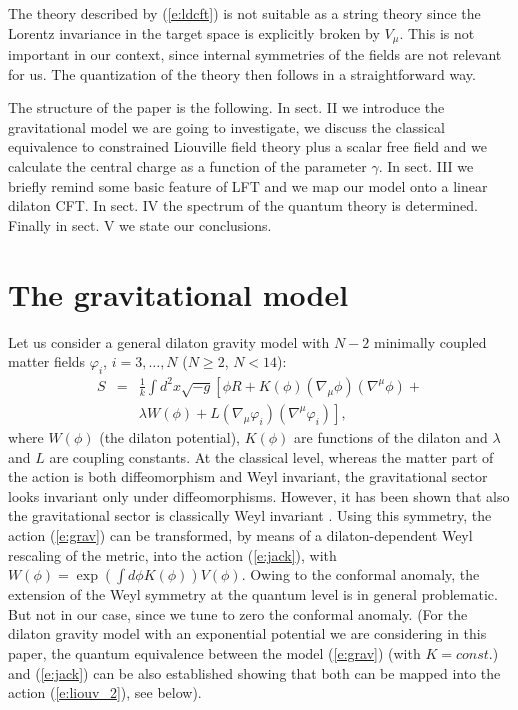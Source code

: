 \documentclass[a4paper,aps,prd,twocolumn,groupedaddress]{revtex4}
\begin{document}
The theory described by (\ref{e:ldcft}) is not suitable as a string theory
since the Lorentz invariance in the target space is explicitly broken
by $V_\mu$. This is not important in our context, since internal
symmetries of the fields are not relevant for us.  The quantization of
the theory then follows in a straightforward way.

The structure of the paper is the following.  In sect. II we introduce
the gravitational model we are going to investigate, we discuss the
classical equivalence to constrained Liouville field theory plus a scalar free
field  and we calculate the central charge as a
function of the parameter $\gamma$. In sect. III we briefly remind some
basic feature of LFT and we map our model onto a linear dilaton
CFT. In sect. IV the spectrum of the quantum theory is determined.
Finally in sect. V we state our conclusions.



\section{The gravitational model}
Let us consider a general dilaton gravity model with $N-2$ minimally
coupled matter fields $\varphi_i$, $i=3,\ldots,N$ ($N\ge 2$, $N<14$):
\begin{eqnarray}\label{e:grav}
S &=& \frac{1}{k}\int d^2x \sqrt{-g} \left[ \phi R +K(\phi)
 (\nabla_{\mu}\phi)(\nabla^{\mu}\phi) +\right. \nonumber \\
 &&\left.\lambda W(\phi)+ L
 (\nabla_{\mu}\varphi_i)(\nabla^{\mu}\varphi_i)\right],
\end{eqnarray}
where $W(\phi)$ (the dilaton potential), $K(\phi)$ are functions of
the dilaton and $\lambda$ and $L$ are coupling constants.  At the
classical level, whereas the matter part of the action is both
diffeomorphism and Weyl invariant, the gravitational sector looks
invariant only under diffeomorphisms.  However, it has been shown that
also the gravitational sector is classically Weyl invariant \cite{c1}.  
Using this  symmetry, the action
(\ref{e:grav}) can be transformed, by means of  a dilaton-dependent Weyl
rescaling of the metric, into the action (\ref{e:jack}), with
$W(\phi)=\exp(\int d\phi K(\phi)) V(\phi)$.  Owing to the conformal
anomaly, the extension of the Weyl symmetry at the quantum level is in
general problematic. But not in our case, since we tune to zero the
conformal anomaly. (For the dilaton gravity model  with an exponential 
potential we are considering in this paper, the quantum equivalence 
between the model (\ref{e:grav}) (with $K=const.$) and (\ref{e:jack})
can be also established showing that both can be mapped into the action
(\ref{e:liouv_2}), see below).
\end{document}
